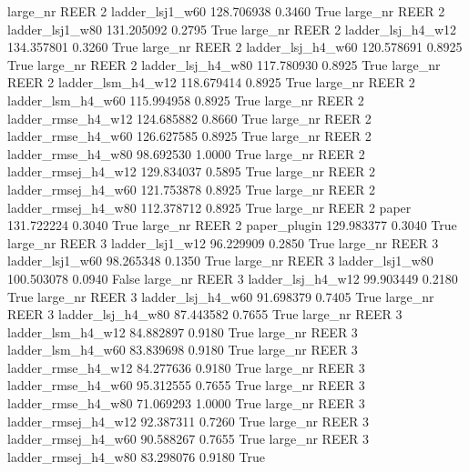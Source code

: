   large_nr     REER                 2     ladder_lsj1_w60  128.706938      0.3460    True
  large_nr     REER                 2     ladder_lsj1_w80  131.205092      0.2795    True
  large_nr     REER                 2   ladder_lsj_h4_w12  134.357801      0.3260    True
  large_nr     REER                 2   ladder_lsj_h4_w60  120.578691      0.8925    True
  large_nr     REER                 2   ladder_lsj_h4_w80  117.780930      0.8925    True
  large_nr     REER                 2   ladder_lsm_h4_w12  118.679414      0.8925    True
  large_nr     REER                 2   ladder_lsm_h4_w60  115.994958      0.8925    True
  large_nr     REER                 2  ladder_rmse_h4_w12  124.685882      0.8660    True
  large_nr     REER                 2  ladder_rmse_h4_w60  126.627585      0.8925    True
  large_nr     REER                 2  ladder_rmse_h4_w80   98.692530      1.0000    True
  large_nr     REER                 2 ladder_rmsej_h4_w12  129.834037      0.5895    True
  large_nr     REER                 2 ladder_rmsej_h4_w60  121.753878      0.8925    True
  large_nr     REER                 2 ladder_rmsej_h4_w80  112.378712      0.8925    True
  large_nr     REER                 2               paper  131.722224      0.3040    True
  large_nr     REER                 2        paper_plugin  129.983377      0.3040    True
  large_nr     REER                 3     ladder_lsj1_w12   96.229909      0.2850    True
  large_nr     REER                 3     ladder_lsj1_w60   98.265348      0.1350    True
  large_nr     REER                 3     ladder_lsj1_w80  100.503078      0.0940   False
  large_nr     REER                 3   ladder_lsj_h4_w12   99.903449      0.2180    True
  large_nr     REER                 3   ladder_lsj_h4_w60   91.698379      0.7405    True
  large_nr     REER                 3   ladder_lsj_h4_w80   87.443582      0.7655    True
  large_nr     REER                 3   ladder_lsm_h4_w12   84.882897      0.9180    True
  large_nr     REER                 3   ladder_lsm_h4_w60   83.839698      0.9180    True
  large_nr     REER                 3  ladder_rmse_h4_w12   84.277636      0.9180    True
  large_nr     REER                 3  ladder_rmse_h4_w60   95.312555      0.7655    True
  large_nr     REER                 3  ladder_rmse_h4_w80   71.069293      1.0000    True
  large_nr     REER                 3 ladder_rmsej_h4_w12   92.387311      0.7260    True
  large_nr     REER                 3 ladder_rmsej_h4_w60   90.588267      0.7655    True
  large_nr     REER                 3 ladder_rmsej_h4_w80   83.298076      0.9180    True
